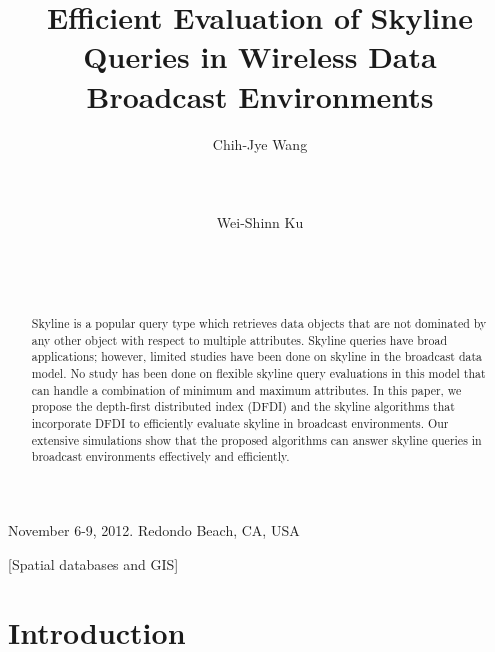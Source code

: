 \documentclass{sig-alternate}
\begin{document}
\title{Efficient Evaluation of Skyline Queries in Wireless Data Broadcast Environments}


\author
{
 \alignauthor Chih-Jye Wang\\
 \\
 \\
 \\
 \alignauthor Wei-Shinn Ku\\
 \\
 \\
 \\
}

 {November 6-9, 2012. Redondo Beach, CA,
USA}

\maketitle

\begin{abstract}
Skyline is a popular query type which retrieves data objects that
are not dominated by any other object with respect to multiple
attributes. Skyline queries have broad applications; however,
limited studies have been done on skyline in the broadcast data
model. No study has been done on flexible skyline query
evaluations in this model that can handle a combination of minimum
and maximum attributes. In this paper, we propose the depth-first
distributed index (DFDI) and the skyline algorithms that
incorporate DFDI to efficiently evaluate skyline in broadcast
environments. Our extensive simulations show that the proposed
algorithms can answer skyline queries in broadcast environments
effectively and efficiently.
\end{abstract}

[Spatial databases and GIS]



\section{Introduction}\label{sec-intro}

\end{document}
